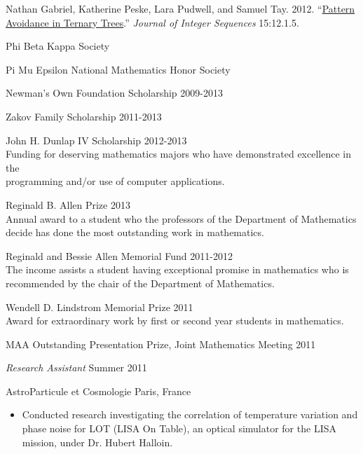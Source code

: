 \documentclass[11pt,article,oneside]{memoir}
\begin{document}
\ind Nathan Gabriel, Katherine Peske, Lara Pudwell, and Samuel Tay. 2012.
  ``\href{http://arxiv.org/abs/1110.2225}{Pattern Avoidance in Ternary Trees}.''
  \emph{Journal of Integer Sequences} 15:12.1.5. \vspace{0.05in}

\bigskip



\ind Phi Beta Kappa Society

\ind Pi Mu Epsilon National Mathematics Honor Society

\ind Newman's Own Foundation Scholarship \hfill {\small 2009-2013}

\ind Zakov Family Scholarship \hfill {\small 2011-2013}

\ind John H. Dunlap IV Scholarship \hfill {\small 2012-2013} \\
\footnotesize
  Funding for deserving mathematics majors who have demonstrated excellence in
  the \\ programming and/or use of computer applications.
\normalsize

\ind Reginald B. Allen Prize \hfill {\small 2013} \\
\footnotesize
  Annual award to a student who the professors of the Department of
  Mathematics decide has done the most outstanding work in mathematics.
\normalsize

\ind Reginald and Bessie Allen Memorial Fund \hfill {\small 2011-2012} \\
\footnotesize
  The income assists a student having exceptional promise in mathematics who is
  recommended by the chair of the Department of Mathematics.
\normalsize

\ind Wendell D. Lindstrom Memorial Prize \hfill {\small 2011} \\
\footnotesize
  Award for extraordinary work by first or second year students in mathematics.
\normalsize

\ind MAA Outstanding Presentation Prize, Joint Mathematics Meeting \hfill {\small 2011} \\

\medskip



\ind \emph{Research Assistant} \hfill {\small Summer 2011}

\ind AstroParticule et Cosmologie \hfill {\small Paris, France}
\small
\begin{itemize}
  \item Conducted research investigating the correlation of temperature
    variation and phase noise for LOT (LISA On Table), an optical simulator for
    the LISA mission, under Dr. Hubert Halloin.
\end{itemize}
\normalsize
\end{document}
